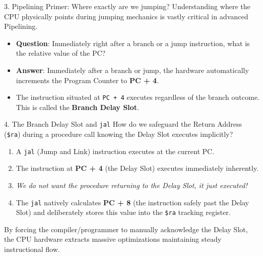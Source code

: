 \documentclass[aspectratio=169]{beamer}
\begin{document}
\begin{frame}{3. Pipelining Primer: Where exactly are we jumping?}
Understanding where the CPU physically points during jumping mechanics is vastly critical in advanced Pipelining.
\vspace{0.2cm}
\begin{itemize}
    \item \textbf{Question}: Immediately right after a branch or a jump instruction, what is the relative value of the PC?
    \item \textbf{Answer}: Immediately after a branch or jump, the hardware automatically increments the Program Counter to \textbf{PC + 4}.
    \item The instruction situated at \texttt{PC + 4} executes regardless of the branch outcome. This is called the \textbf{Branch Delay Slot}.
\end{itemize}
\end{frame}

\begin{frame}{4. The Branch Delay Slot and \texttt{jal}}
How do we safeguard the Return Address (\texttt{\$ra}) during a procedure call knowing the Delay Slot executes implicitly?
\vspace{0.2cm}
\begin{enumerate}
    \item A \texttt{jal} (Jump and Link) instruction executes at the current PC.
    \item The instruction at \textbf{PC + 4} (the Delay Slot) executes immediately inherently.
    \item \textit{We do not want the procedure returning to the Delay Slot, it just executed!}
    \item The \texttt{jal} natively calculates \textbf{PC + 8} (the instruction safely past the Delay Slot) and deliberately stores this value into the \texttt{\$ra} tracking register.
\end{enumerate}
\vspace{0.2cm}
By forcing the compiler/programmer to manually acknowledge the Delay Slot, the CPU hardware extracts massive optimizations maintaining steady instructional flow.
\end{frame}
\end{document}
